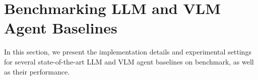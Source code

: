 \section{Benchmarking LLM and VLM Agent Baselines}\label{sec:experiments}
\vspace{-10pt}

In this section, we present the implementation details and experimental settings for several state-of-the-art LLM and VLM agent baselines on \ours benchmark, as well as their performance.


\begin{table}[ht]
\centering
\vspace{-15pt}
\caption{
Success rates of baseline LLM and VLM agents on \ours, grouped by task categories: OS, Office (LibreOffice Calc, Impress, Writer), Daily (Chrome, VLC Player, Thunderbird), Professional (VS Code and GIMP) and Workflow (tasks involving multiple apps), for gaining insights from interfaces and operation logic.
See App.~\ref{app:prompting_details} and \ref{app:full_results} for more details.
}
\label{tab:exp_baseline}
\small
{}
\end{table}
